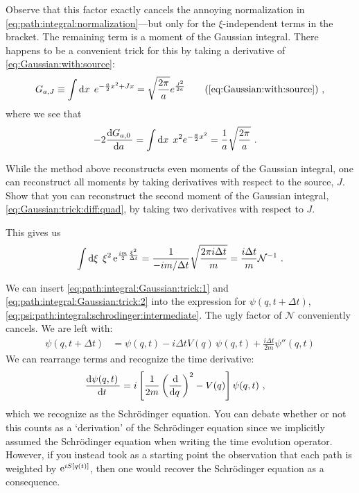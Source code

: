 \documentclass[12pt, oneside]{report}    %
\begin{document}
Observe that this factor exactly cancels the annoying normalization in \eqref{eq:path:integral:normalization}---but only for the $\xi$-independent terms in the bracket. The remaining term is a moment of the Gaussian integral. There happens to be a convenient trick for this by taking a derivative of \eqref{eq:Gaussian:with:source}:
\begin{align}
    G_{a,J} \equiv \int \D{x}\; e^{-\frac{a}{2}x^2 + Jx} = \sqrt{\frac{2\pi}{a}}  e^{\frac{J^2}{2a}} 
    \tag{\ref{eq:Gaussian:with:source}} \ ,
\end{align}
where we see that
\begin{align}
    -2\frac{\operatorname{d}\mkern-3mu^{}\mkern-1mu{G_{a,0}}\,}{\operatorname{d}\mkern-3mu^{}\mkern-1mu{a}\,} &= \int \operatorname{d}\mkern-3mu^{}\mkern-1mu{x}\,\; x^2 e^{-\frac{a}{2}x^2} 
    = \frac{1}{a}\sqrt{\frac{2\pi}{a}} \ .
    \label{eq:Gaussian:trick:diff:quad}
\end{align}
\begin{exercise}
While the method above reconstructs even moments of the Gaussian integral, one can reconstruct all moments by taking derivatives with respect to the source, $J$. Show that you can reconstruct the second moment of the Gaussian integral, \eqref{eq:Gaussian:trick:diff:quad}, by taking two derivatives with respect to $J$. 
\end{exercise}
This gives us 
\begin{align}
    \int \operatorname{d}\mkern-3mu^{}\mkern-1mu{\xi}\,\; \xi^2
    \operatorname{e}^{\frac{im}{2}\frac{\xi^2}{\Delta t}} 
    = 
    \frac{1}{-im/\Delta t}
    \sqrt{\frac{2\pi i\Delta t}{m}} 
    =\frac{i\Delta t}{m} \mathcal{N}^{-1} \ .
    \label{eq:path:integral:Gaussian:trick:2}
\end{align}

We can insert \eqref{eq:path:integral:Gaussian:trick:1} and \eqref{eq:path:integral:Gaussian:trick:2} into the expression for $\psi(q,t+\Delta t)$, \eqref{eq:psi:path:integral:schrodinger:intermediate}. The ugly factor of $\mathcal N$ conveniently cancels. We are left with:
\begin{align}
    \psi(q,t+\Delta t) &= \psi(q,t) - i \Delta t V(q)\, \psi(q,t) + \frac{i\Delta t}{2m} \psi''(q,t)
\end{align}
We can rearrange terms and recognize the time derivative:
\begin{align}
    \frac{\operatorname{d}\mkern-3mu^{}\mkern-1mu{\psi(q,t)}\,}{\operatorname{d}\mkern-3mu^{}\mkern-1mu{t}\,}
    &= i\left[\frac{1}{2m}\left(\frac{\textnormal{d}}{\operatorname{d}\mkern-3mu^{}\mkern-1mu{q}\,}\right)^2 - V(q)\right]\psi(q,t) \ ,
\end{align}
which we recognize as the Schr\"odinger equation. You can debate whether or not this counts as a `derivation' of the Schr\"odinger equation since we implicitly assumed the Schr\"odinger equation when writing the time evolution operator. However, if you instead took as a starting point the observation that each path is weighted by $\operatorname{e}^{iS[q(t)]}$, then one would recover the Schr\"odinger equation as a consequence. 
\end{document}
